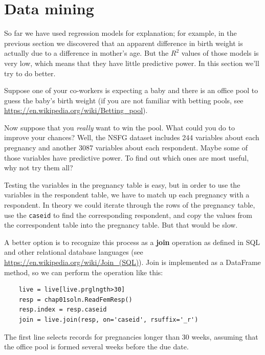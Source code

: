 \documentclass[12pt]{book}
\begin{document}
\section{Data mining}
\label{mining}

So far we have used regression models for explanation; for example,
in the previous section we discovered that an apparent difference
in birth weight is actually due to a difference in mother's age.
But the $R^2$ values of those models is very low, which means that
they have little predictive power.  In this section we'll try to
do better.

Suppose one of your co-workers is expecting a baby and
there is an office pool to guess the baby's birth weight (if you are
not familiar with betting pools, see
\url{https://en.wikipedia.org/wiki/Betting_pool}).

Now suppose that you {\em really\/} want to win the pool.  What could
you do to improve your chances?  Well, 
the NSFG dataset includes 244 variables about each pregnancy and another
3087 variables about each respondent.  Maybe some of those variables
have predictive power.  To find out which ones are most useful,
why not try them all?

Testing the variables in the pregnancy table is easy, but in order to
use the variables in the respondent table, we have to match up each
pregnancy with a respondent.  In theory we could iterate through the
rows of the pregnancy table, use the {\tt caseid} to find the
corresponding respondent, and copy the values from the
correspondent table into the pregnancy table.  But that would be slow.

A better option is to recognize this process as a {\bf join} operation
as defined in SQL and other relational database languages (see
\url{https://en.wikipedia.org/wiki/Join_(SQL)}).  Join is implemented
as a DataFrame method, so we can perform the operation like this:

\begin{verbatim}
    live = live[live.prglngth>30]
    resp = chap01soln.ReadFemResp()
    resp.index = resp.caseid
    join = live.join(resp, on='caseid', rsuffix='_r')
\end{verbatim}

The first line selects records for pregnancies longer than 30 weeks,
assuming that the office pool is formed several weeks before the
due date.
\end{document}
